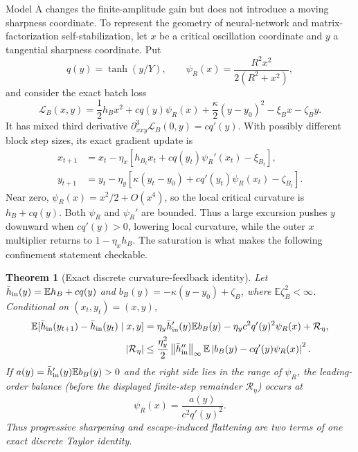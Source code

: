 \documentclass[10pt]{article}
\newtheorem{theorem}{Theorem}[section]
\theoremstyle{definition}
\theoremstyle{remark}
\newcommand{\E}{\mathbb E}
\newcommand{\norm}[1]{\left\lVert#1\right\rVert}
\begin{document}
Model A changes the finite-amplitude gain but does not introduce a moving
sharpness coordinate.  To represent the geometry of neural-network and
matrix-factorization self-stabilization, let $x$ be a critical oscillation
coordinate and $y$ a tangential sharpness coordinate.  Put
\[
 q(y)=\tanh(y/Y),\qquad
 \psi_R(x)=\frac{R^2x^2}{2(R^2+x^2)},
\]
and consider the exact batch loss
\begin{equation}
 \mathcal L_B(x,y)=\frac12h_Bx^2+cq(y)\psi_R(x)
 +\frac\kappa2(y-y_0)^2-\xi_Bx-\zeta_By .
 \label{eq:feedback-loss}
\end{equation}
It has mixed third derivative
$\partial_{xxy}^3\mathcal L_B(0,y)=cq'(y)$.  With possibly different block
step sizes, its exact gradient update is
\begin{align}
 x_{t+1}&=x_t-\eta_x
 \left[h_{B_t}x_t+cq(y_t)\psi_R'(x_t)-\xi_{B_t}\right],
 \label{eq:feedback-x}\\
 y_{t+1}&=y_t-\eta_y
 \left[\kappa(y_t-y_0)+cq'(y_t)\psi_R(x_t)-\zeta_{B_t}\right].
 \label{eq:feedback-y}
\end{align}
Near zero, $\psi_R(x)=x^2/2+O(x^4)$, so the local critical curvature is
$h_B+cq(y)$.  Both $\psi_R$ and $\psi_R'$ are bounded.  Thus a large
excursion pushes $y$ downward when $cq'(y)>0$, lowering local curvature,
while the outer $x$ multiplier returns to $1-\eta_xh_B$.  The saturation is
what makes the following confinement statement checkable.

\begin{theorem}[Exact discrete curvature-feedback identity]
\label{thm:curvature-feedback}
Let $\bar h_{\rm in}(y)=\E h_B+cq(y)$ and
$b_B(y)=-\kappa(y-y_0)+\zeta_B$, where $\E\zeta_B^2<\infty$.
Conditional on $(x_t,y_t)=(x,y)$,
\begin{align}
 \E[\bar h_{\rm in}(y_{t+1})-\bar h_{\rm in}(y_t)\mid x,y]
 &=\eta_y\bar h_{\rm in}'(y)\E b_B(y)
 -\eta_yc^2q'(y)^2\psi_R(x)
 +\mathcal R_\eta, \\
 |\mathcal R_\eta|
 &\le \frac{\eta_y^2}{2}\norm{\bar h_{\rm in}''}_\infty
 \E\left|b_B(y)-cq'(y)\psi_R(x)\right|^2.
 \label{eq:curvature-drift}
\end{align}
If $a(y)=\bar h_{\rm in}'(y)\E b_B(y)>0$ and the right side lies in the
range of $\psi_R$, the leading-order balance (before the displayed finite-step
remainder $\mathcal R_\eta$) occurs at
\begin{equation}
 \psi_R(x)=\frac{a(y)}{c^2q'(y)^2}.
 \label{eq:amplitude-balance}
\end{equation}
Thus progressive sharpening and escape-induced flattening are two terms of
one exact discrete Taylor identity.
\end{theorem}
\end{document}
